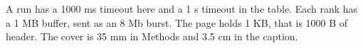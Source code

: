 A run has a 1000 ms timeout here and a 1 s timeout in the table.
Each rank has a 1 MB buffer, sent as an 8 Mb burst.
The page holds 1 KB, that is 1000 B of header.
The cover is 35 mm in Methods and 3.5 cm in the caption.
